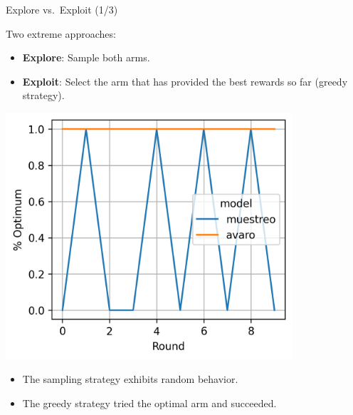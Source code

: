 \documentclass[11pt]{beamer}
\begin{document}
\begin{frame}{Explore vs.~Exploit (1/3)}

Two extreme approaches:

\begin{itemize}
\item \textbf{Explore}: Sample both arms.
\item \textbf{Exploit}: Select the arm that has provided the best rewards so far (greedy strategy).
\end{itemize}

\pause

\begin{minipage}{.6\linewidth}
\begin{center}
\includegraphics[width=0.8\textwidth]{images/arriba}
\end{center}
\end{minipage}\begin{minipage}{.4\linewidth}
\begin{itemize}
\item The sampling strategy exhibits random behavior.
\item<3-> The greedy strategy tried the optimal arm and succeeded.
\end{itemize}
\end{minipage}

\end{frame}
\end{document}
